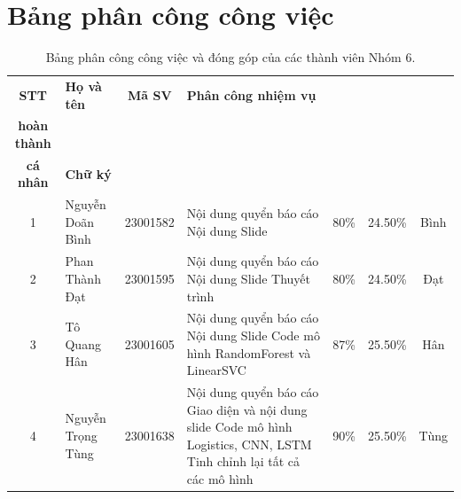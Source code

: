 
\chapter{Bảng phân công công việc} %

\label{AppendixC} %


\begin{table}[htbp]
	\centering
	\caption{Bảng phân công công việc và đóng góp của các thành viên Nhóm 6.}
	\label{tab:phancông_nhom6}
	\footnotesize %
	\begin{tabularx}{\textwidth}{|c|p{2.8cm}|c|X|c|c|c|}
		\hline
		\textbf{STT} & \textbf{Họ và tên} & \textbf{Mã SV} & \textbf{Phân công nhiệm vụ} & \begin{tabular}[c]{@{}c@{}}\textbf{Mức độ}\\\textbf{hoàn thành}\end{tabular} & \begin{tabular}[c]{@{}c@{}}\textbf{Trọng số}\\\textbf{cá nhân}\end{tabular} & \textbf{Chữ ký} \\ \hline
		1 & Nguyễn Doãn Bình & 23001582 & Nội dung quyển báo cáo \newline Nội dung Slide & 80\% & 24.50\% & Bình \\ \hline
		2 & Phan Thành Đạt & 23001595 & Nội dung quyển báo cáo \newline Nội dung Slide \newline Thuyết trình & 80\% & 24.50\% & Đạt \\ \hline
		3 & Tô Quang Hân & 23001605 & Nội dung quyển báo cáo \newline Nội dung Slide \newline Code mô hình RandomForest và LinearSVC & 87\% & 25.50\% & Hân \\ \hline
		4 & Nguyễn Trọng Tùng & 23001638 & Nội dung quyển báo cáo \newline Giao diện và nội dung slide \newline Code mô hình Logistics, CNN, LSTM \newline Tinh chỉnh lại tất cả các mô hình & 90\% & 25.50\% & Tùng \\ \hline
	\end{tabularx}
\end{table}
